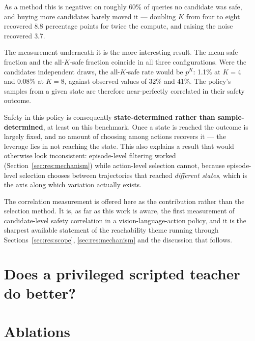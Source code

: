\documentclass[a4paper,11pt]{report}
\begin{document}
As a method this is negative: on roughly 60\% of queries no candidate was safe, and buying more
candidates barely moved it --- doubling $K$ from four to eight recovered 8.8 percentage points for
twice the compute, and raising the noise recovered 3.7.

The measurement underneath it is the more interesting result. The mean safe fraction and the
all-$K$-safe fraction coincide in all three configurations. Were the candidates independent draws,
the all-$K$-safe rate would be $p^{K}$: 1.1\% at $K = 4$ and 0.08\% at $K = 8$, against observed
values of 32\% and 41\%. The policy's samples from a given state are therefore near-perfectly
correlated in their safety outcome.

Safety in this policy is consequently \textbf{state-determined rather than sample-determined}, at
least on this benchmark. Once a state is reached the outcome is largely fixed, and no amount of
choosing among actions recovers it --- the leverage lies in not reaching the state. This also
explains a result that would otherwise look inconsistent: episode-level filtering worked
(Section~\ref{sec:res:mechanism}) while action-level selection cannot, because episode-level
selection chooses between trajectories that reached \emph{different states}, which is the axis
along which variation actually exists.

The correlation measurement is offered here as the contribution rather than the selection method.
It is, as far as this work is aware, the first measurement of candidate-level safety correlation in
a vision-language-action policy, and it is the sharpest available statement of the reachability
theme running through Sections~\ref{sec:res:scope}, \ref{sec:res:mechanism} and the discussion that
follows.



\section{Does a privileged scripted teacher do better?}

\section{Ablations}

\end{document}
